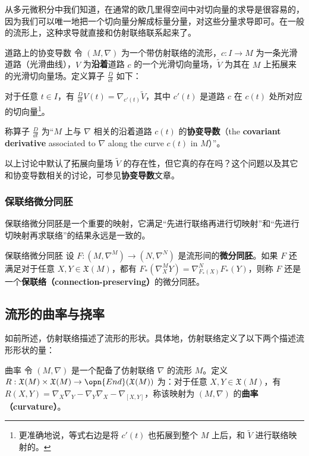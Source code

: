 从多元微积分中我们知道，在通常的欧几里得空间中对切向量的求导是很容易的，因为我们可以唯一地把一个切向量分解成标量分量，对这些分量求导即可。在一般的流形上，这种求导就直接和仿射联络联系起来了。

\begin{definition}{道路上的协变导数}
令 $(M, \nabla)$ 为一个带仿射联络的流形，$c:I\to M$ 为一条光滑道路（光滑曲线），$V$ 为\textbf{沿着}道路 $c$ 的一个光滑切向量场，$\tilde{V}$ 为其在 $M$ 上拓展来的光滑切向量场。定义算子 $\frac{D}{\dd t}$ 如下：

对于任意 $t\in I$，有 $\frac{D}{\dd t}V(t)=\nabla_{c'(t)}\tilde{V}$，其中 $c'(t)$ 是道路 $c$ 在 $c(t)$ 处所对应的切向量\footnote{更准确地说，等式右边是将 $c'(t)$ 也拓展到整个 $M$ 上后，和 $\tilde{V}$ 进行联络映射的。}。

称算子 $\frac{D}{\dd t}$ 为“$M$ 上与 $\nabla$ 相关的沿着道路 $c(t)$ 的\textbf{协变导数}（the \textbf{covariant derivative} associated to $\nabla$ along the curve $c(t)$ in $M$）”。
\end{definition}

以上讨论中默认了拓展向量场 $\tilde{V}$ 的存在性，但它真的存在吗？这个问题以及其它和协变导数相关的讨论，可参见\textbf{协变导数}文章。





\subsubsection{保联络微分同胚}

保联络微分同胚是一个重要的映射，它满足“先进行联络再进行切映射”和“先进行切映射再求联络”的结果永远是一致的。

\begin{definition}{保联络微分同胚}
设 $F:(M, \nabla^M)\to (N, \nabla^N)$ 是流形间的\textbf{微分同胚}。如果 $F$ 还满足对于任意 $X, Y\in \mathfrak{X}(M)$，都有 $F_*(\nabla^M_XY)=\nabla^N_{F_*(X)}F_*(Y)$，则称 $F$ 还是一个\textbf{保联络（connection-preserving）}的微分同胚。
\end{definition}




\subsection{流形的曲率与挠率}

如前所述，仿射联络描述了流形的形状。具体地，仿射联络定义了以下两个描述流形形状的量：

\begin{definition}{曲率}
令 $(M, \nabla)$ 是一个配备了仿射联络 $\nabla$ 的流形 $M$。定义 $R:\mathfrak{X}(M)\times\mathfrak{X}(M)\to\opn{End}(\mathfrak{X}(M))$ 为：对于任意 $X, Y\in\mathfrak{X}(M)$，有 $R(X, Y)=\nabla_X\nabla_Y-\nabla_Y\nabla_X-\nabla_{[X, Y]}$，称该映射为 $(M, \nabla)$ 的\textbf{曲率（curvature）}。
\end{definition}

